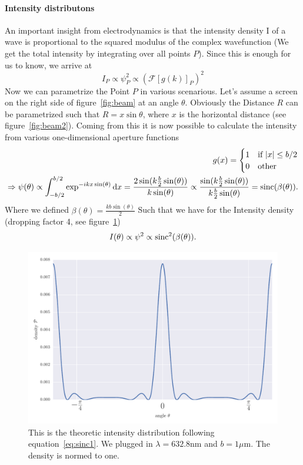 \paragraph{Intensity distributons}An important insight from electrodynamics is that the intensity density I of a
wave is proportional to the squared modulus of the complex wavefunction (We get the total intensity by
integrating over all points $P$).
Since this is enough for us to
know, we arrive at
\begin{equation}
    I_P \propto \psi_P^2 \propto \left ( \mathcal{F} \left[g(k)\right ]_P \right )^2 
\end{equation}
Now we can parametrize the Point $P$ in various scenarious. Let's assume a screen on the right side of
figure~\ref{fig:beam} at an angle $\theta$. Obviously the Distance $R$ can be parametrized such that
$R = x \sin \theta $, where $x$ is the horizontal distance (see figure~\ref{fig:beam2}).
Coming from this it is now possible to calculate the intensity from various one-dimensional aperture
functions
\begin{align}
    \label{eq:g1}
    g(x) = 
    \begin{cases}
        1 & \text{if } |x| \leq b/2 \\ 
        0 & \text{other }
    \end{cases} \\
\Rightarrow \psi(\theta) \propto
\int_{-b/2}^{b/2} \exp ^{-i k x \sin(\theta)} \mathrm{d} x
= \frac{2\sin ( k \frac{b}{2} \sin ( \theta ))}{k \sin(\theta)} \propto
\frac{\sin ( k \frac{b}{2} \sin ( \theta ))}{k \frac{b}{2}  \sin(\theta)} 
= \mathrm{sinc}(\beta(\theta)).
\end{align}
Where we defined $\beta(\theta) = \frac{kb \sin(\theta)}{2} $
Such that we have for the Intensity density (dropping factor 4, see figure~\ref{fig:sinc1})
\begin{equation}
    \label{eq:sinc1}
    I(\theta) \propto \psi^2 \propto \mathrm{sinc}^2(\beta(\theta)).
\end{equation}
\begin{figure}[htpb]
    \centering
    \includegraphics[width=0.8\linewidth]{figures/sinc1}
    \caption{This is the theoretic intensity distribution following equation~\eqref{eq:sinc1}. 
        We plugged in $\lambda = 632.8$nm and $b = 1 \mu$m. The density is normed to one.}
    \label{fig:sinc1}
\end{figure}

